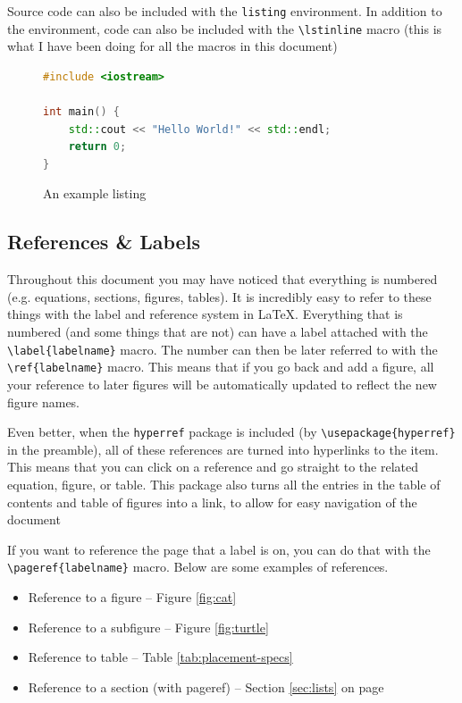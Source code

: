 \documentclass{article}
\begin{document}
Source code can also be included with the \lstinline{listing} environment. In addition to the environment, code can also be included with the \lstinline{\lstinline} macro (this is what I have been doing for all the macros in this document)

\begin{figure}
\caption{An example listing}
\begin{lstlisting}[language=c++,keywordstyle=\color{blue}]
#include <iostream>

int main() {
    std::cout << "Hello World!" << std::endl;
    return 0;
}
\end{lstlisting}
\end{figure}

\subsection{References \& Labels}
Throughout this document you may have noticed that everything is numbered (e.g. equations, sections, figures, tables). It is incredibly easy to refer to these things with the label and reference system in \LaTeX{}. Everything that is numbered (and some things that are not) can have a label attached with the \lstinline|\label{labelname}| macro. The number can then be later referred to with the \lstinline|\ref{labelname}| macro. This means that if you go back and add a figure, all your reference to later figures will be automatically updated to reflect the new figure names.

Even better, when the \lstinline{hyperref} package is included (by \lstinline|\usepackage{hyperref}| in the preamble), all of these references are turned into hyperlinks to the item. This means that you can click on a reference and go straight to the related equation, figure, or table. This package also turns all the entries in the table of contents and table of figures into a link, to allow for easy navigation of the document

If you want to reference the page that a label is on, you can do that with the \lstinline|\pageref{labelname}| macro.
Below are some examples of references.
\begin{itemize}
  \item Reference to a figure -- Figure \ref{fig:cat}
  \item Reference to a subfigure -- Figure \ref{fig:turtle}
  \item Reference to table -- Table \ref{tab:placement-specs}
  \item Reference to a section (with pageref) -- Section \ref{sec:lists} on page \pageref{sec:lists}
\end{itemize}
\end{document}
